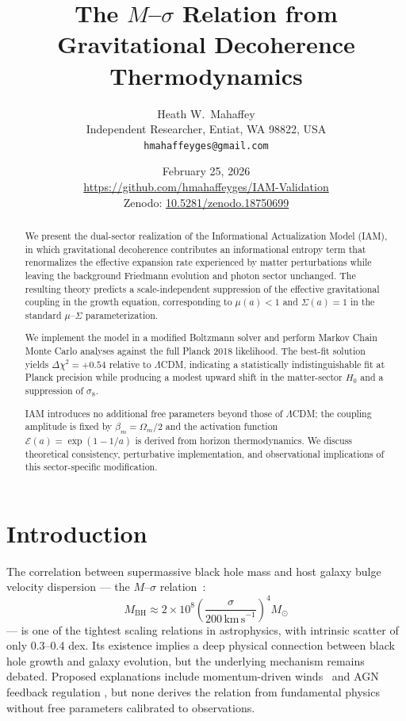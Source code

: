 \documentclass[12pt,a4paper]{article}
\title{The $M$--$\sigma$ Relation from Gravitational Decoherence Thermodynamics}
\author{Heath W.\ Mahaffey\\
\small Independent Researcher, Entiat, WA 98822, USA\\
\small \texttt{hmahaffeyges@gmail.com}}
\date{February 25, 2026\\
\small \url{https://github.com/hmahaffeyges/IAM-Validation}\\
\small Zenodo: \href{https://doi.org/10.5281/zenodo.18750699}{10.5281/zenodo.18750699}}
\begin{document}
\maketitle


\begin{abstract}
We present the dual-sector realization of the Informational Actualization Model (IAM),
in which gravitational decoherence contributes an informational entropy term that
renormalizes the effective expansion rate experienced by matter perturbations while
leaving the background Friedmann evolution and photon sector unchanged.
The resulting theory predicts a scale-independent suppression of the effective
gravitational coupling in the growth equation, corresponding to $\mu(a) < 1$
and $\Sigma(a) = 1$ in the standard $\mu$--$\Sigma$ parameterization.

We implement the model in a modified Boltzmann solver and perform Markov Chain
Monte Carlo analyses against the full Planck 2018 likelihood. The best-fit solution
yields $\Delta\chi^2 = +0.54$ relative to $\Lambda$CDM, indicating a statistically
indistinguishable fit at Planck precision while producing a modest upward shift
in the matter-sector $H_0$ and a suppression of $\sigma_8$.

IAM introduces no additional free parameters beyond those of $\Lambda$CDM;
the coupling amplitude is fixed by $\beta_m = \Omega_m/2$ and the activation
function $\mathcal{E}(a) = \exp(1-1/a)$ is derived from horizon thermodynamics.
We discuss theoretical consistency, perturbative implementation, and observational
implications of this sector-specific modification.
\end{abstract}


\section{Introduction}

The correlation between supermassive black hole mass and host galaxy bulge velocity
dispersion --- the $M$--$\sigma$ relation~\citep{Ferrarese2000,Gebhardt2000,
McConnell2013}:
\begin{equation}
M_\mathrm{BH} \approx 2 \times 10^8 \left(\frac{\sigma}{200\,\mathrm{km\,s}^{-1}}\right)^4 M_\odot
\end{equation}
--- is one of the tightest scaling relations in astrophysics, with intrinsic scatter
of only 0.3--0.4 dex. Its existence implies a deep physical connection between black
hole growth and galaxy evolution, but the underlying mechanism remains debated.
Proposed explanations include momentum-driven winds~\citep{King2003} and AGN feedback
regulation \citep{Silk1998,Hopkins2007}, but none derives the relation from
fundamental physics without free parameters calibrated to observations.
\end{document}
